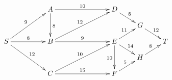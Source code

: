 \documentclass{standalone}
\begin{document}
\vspace{-2ex}
\[\xymatrix@R-0.5cm@C-0.1cm{
& & A \ar[rrr]^{10} \ar[dd]^8 & & & D \ar[dr]^{8} \\
& & & & & & G \ar[dr]^{12} \\
S \ar[uurr]^9 \ar[rr]^8 \ar[ddrr]^{12} & & B \ar[rrr]^9 \ar[uurrr]^{12} & & & E \ar[ur]^{11} \ar[dr]^{14} \ar[dd]_{10} & & T \\
& & & & & & H \ar[ur]^8 \\
& & C \ar[rrr]^{15} \ar[uurrr]^{10} & & & F \ar[ur]^{5}
}\]
\end{document}
